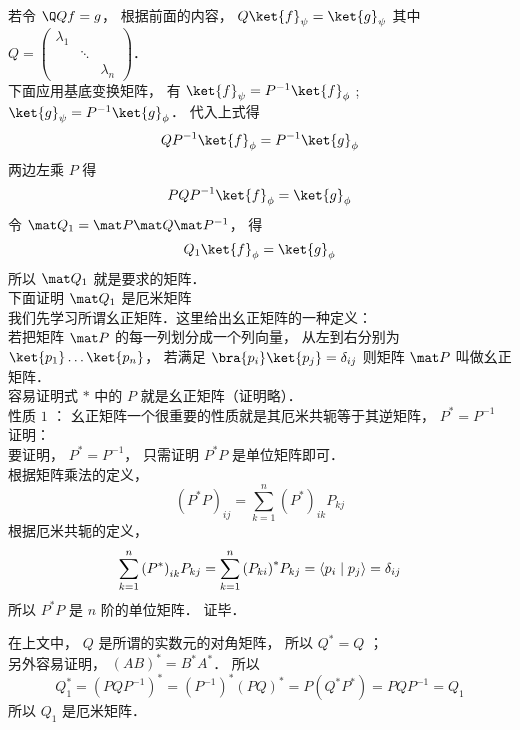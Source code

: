 若令 $\Q Q f = g$，  根据前面的内容， $Q \ket{f}_\psi = \ket{g}_\psi$ 其中 $Q = \left( {\begin{aligned}
{\lambda_1}&{}&{}\\
{}& \ddots &{}\\
{}&{}&{\lambda_n}
\end{aligned}} \right)$． \\
下面应用基底变换矩阵， 有 $\ket{f}_\psi = P^{-1} \ket{f}_\phi$ ; $\ket{g}_\psi = P^{-1} \ket{g}_\phi$． 代入上式得
\begin{equation}
Q P^{-1} \ket{f}_\phi = P^{-1} \ket{g}_\phi
\end{equation}
两边左乘 $P$ 得
\begin{equation}
PQ P^{-1} \ket{f}_\phi = \ket{g}_\phi
\end{equation}
令 $\mat Q_1 = \mat P\mat Q \mat P^{-1}$，  得
\begin{equation}
Q_1 \ket{f}_\phi = \ket{g}_\phi
\end{equation}
所以 $\mat Q_1$ 就是要求的矩阵．\\
下面证明 $\mat Q_1$ 是厄米矩阵\\
我们先学习所谓幺正矩阵．这里给出幺正矩阵的一种定义：\\
若把矩阵 $\mat P$ 的每一列划分成一个列向量， 从左到右分别为$\ket{p_1} \dots\ket{p_n}$，  若满足 $\bra{p_i}\ket{p_j}=\delta_{ij}$ 则矩阵 $\mat P$ 叫做幺正矩阵．\\
容易证明式 $*$ 中的 $P$ 就是幺正矩阵（证明略）．\\
性质 $1$ ： 幺正矩阵一个很重要的性质就是其厄米共轭等于其逆矩阵， ${P^*} = {P^{ - 1}}$ \\
证明：\\
要证明， $P^* = P^{-1}$，  只需证明 $P^* P$ 是单位矩阵即可．\\
根据矩阵乘法的定义，
\begin{equation}
{\left( {{P^*}P} \right)_{ij}} = \sum\limits_{k = 1}^n {{{\left( {P^*} \right)}_{ik}}{P_{kj}}}
\end{equation}
根据厄米共轭的定义，
\begin{equation}
 \sum\limits_{k = 1}^n {{{\left( {P^*} \right)}_{ik}}{P_{kj}}}  = \sum\limits_{k = 1}^n {{{\left( {P_{ki}} \right)}^*}{P_{kj}}}  = \left\langle {p_i}
 \mathrel{\left | {\vphantom {{p_i} {p_j}}}
 \right. \kern-\nulldelimiterspace}
 {p_j} \right\rangle  = {\delta_{ij}}
\end{equation}
所以 ${P^*}P$ 是 $n$ 阶的单位矩阵．  证毕．

在上文中， $Q$ 是所谓的实数元的对角矩阵， 所以 ${Q^*} = Q$ ；\\
另外容易证明， ${\left( {AB} \right)^*} = {B^*}{A^*}$．  所以
\begin{equation}
Q_1^* = {\left( {PQ{P^{ - 1}}} \right)^*} = {\left( {P^{ - 1}} \right)^*}{\left( {PQ} \right)^*} = P\left( {{Q^*}{P^*}} \right) = PQ{P^{ - 1}} = {Q_1}
\end{equation}
所以 ${Q_1}$ 是厄米矩阵．

